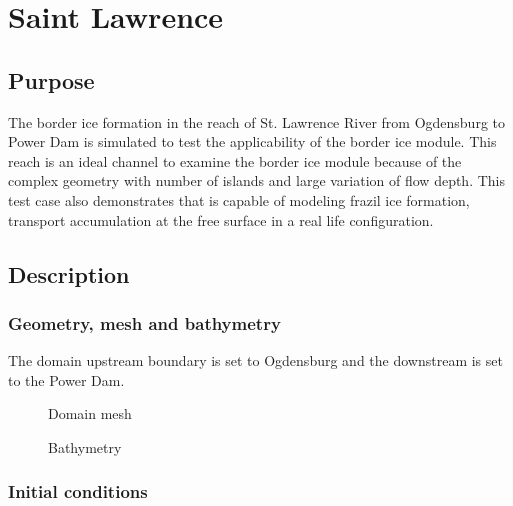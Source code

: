 \renewcommand{\labelitemi}{$\triangleright$}

\chapter{Saint Lawrence}

\section{Purpose}

The border ice formation in the reach of St. Lawrence River from Ogdensburg to Power Dam is
simulated to test the applicability of the border ice module. This reach is an ideal channel to
examine the border ice module because of the complex geometry with number of islands and
large variation of flow depth. 
This test case also demonstrates that \khione is capable of modeling frazil ice formation,
transport accumulation at the free surface in a real life configuration.

\section{Description}

\subsection{Geometry, mesh and bathymetry}

The domain upstream boundary is set to Ogdensburg and the downstream is set to the Power Dam.

\begin{figure}[H]
    \begin{center}
    \end{center}
    \caption{Domain mesh}
    \label{fig:mesh}
\end{figure}

\begin{figure}[H]
    \begin{center}
    \end{center}
    \caption{Bathymetry}
    \label{fig:bathy}
\end{figure}


\subsection{Initial conditions}

